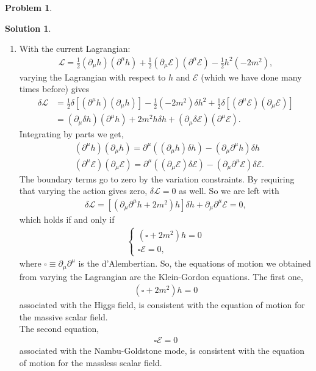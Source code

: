 \documentclass[a4paper,11pt]{article}
\numberwithin{equation}{section}
\theoremstyle{definition}
\newtheorem{prob}{Problem}[section]
\newtheorem{sln}{Solution}[section]
\newcommand{\p}{\partial}
\newcommand{\lag}{\mathcal{L}}
\newcommand{\E}{\mathcal{E}}
\begin{document}
\begin{prob}
\begin{sln}
\begin{enumerate}
			\item With the current Lagrangian:
			\begin{align}
			\lag = \frac{1}{2}\left(\p_\mu h\right)\left(\p^\mu h\right)+ \frac{1}{2}\left(\p_\mu\E\right)\left( \p^\mu\E\right) - \frac{1}{2}h^2(-2m^2),
			\end{align}
			varying the Lagrangian with respect to $h$ and $\E$ (which we have done many times before) gives
			\begin{align}
			\delta \lag &= \frac{1}{2}\delta\left[(\p^\mu h)(\p_\mu h)\right] - \frac{1}{2}(-2m^2)\delta h^2 + \frac{1}{2}\delta\left[(\p^\mu\E)( \p_\mu \E)\right]\nonumber\\
			&= (\p_\mu \delta h)(\p^\mu h) + 2m^2 h\delta h + (\p_\mu \delta \E )(\p^\mu \E).
			\end{align}
			Integrating by parts we get,
			\begin{align}
			&(\p^\mu h)( \p_\mu h) = \p^\mu \left((\p_\mu h)\delta h\right) - \left(\p_\mu\p^\mu h\right)\delta h\\
			&(\p^\mu \E) (\p_\mu \E )= \p^\mu \left((\p_\mu \E)\delta \E\right) - \left(\p_\mu\p^\mu \E\right)\delta \E.
			\end{align}
			The boundary terms go to zero by the variation constraints. By requiring that varying the action gives zero, $\delta \lag = 0$ as well. So we are left with
			\begin{align}
			\delta \lag = \left[(\p_\mu\p^\mu h + 2m^2)h\right]\delta h  + \p_\mu \p^\mu \E = 0,
			\end{align}
			which holds if and only if 
			\begin{align}
			\begin{cases}
			(\square + 2m^2)h = 0\\
			\square \E = 0,
			\end{cases}
			\end{align}
			where $\square\equiv \p_\mu\p^\mu$ is the d'Alembertian. So, the equations of motion we obtained from varying the Lagrangian are the Klein-Gordon equations. The first one,
			\begin{align}
			\boxed{\left(\square + 2m^2\right)h = 0}
			\end{align}
			associated with the Higgs field, is consistent with the equation of motion for the massive scalar field.\\
			
			The second equation,
			\begin{align}
			\boxed{\square \E = 0}
			\end{align}
			associated with the Nambu-Goldstone mode, is consistent with the equation of motion for the massless scalar field. \\
		\end{enumerate}
	\end{sln}
\end{prob}
\end{document}
